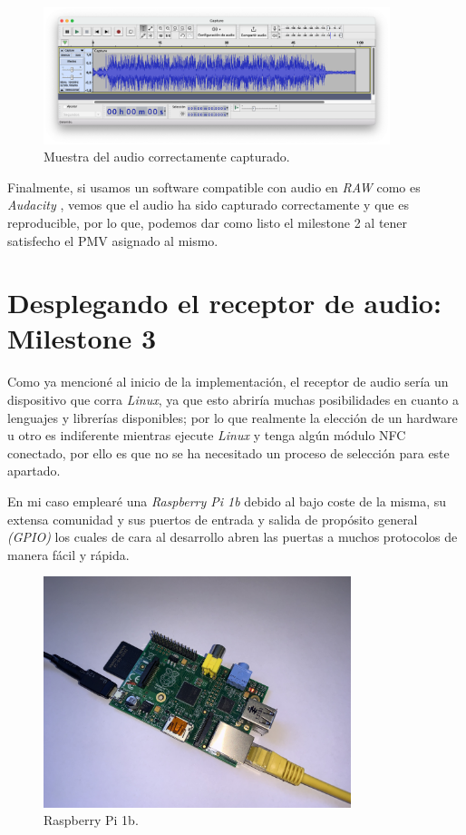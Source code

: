 \begin{figure}[h!]
    \centering
    \includegraphics[width=0.9\textwidth]{fotos/muestra_captura_audacity.png}
    \caption{Muestra del audio correctamente capturado.}
\end{figure}

Finalmente, si usamos un software compatible con audio en \emph{RAW} como es
\emph{Audacity} \cite{software-audacity}, vemos que el audio ha sido capturado
correctamente y que es reproducible, por lo que, podemos dar como listo el
milestone 2 al tener satisfecho el PMV asignado al mismo. 


\section{Desplegando el receptor de audio: Milestone 3}

Como ya mencioné al inicio de la implementación, el receptor de audio sería un
dispositivo que corra \emph{Linux}, ya que esto abriría muchas posibilidades en
cuanto a lenguajes y librerías disponibles; por lo que realmente la elección de un
hardware u otro es indiferente mientras ejecute \emph{Linux} y tenga algún
módulo NFC conectado, por ello es que no se ha necesitado un proceso de
selección para este apartado.

En mi caso emplearé una \emph{Raspberry Pi 1b} debido al bajo coste de la misma, su
extensa comunidad y sus puertos de entrada y salida de propósito general
\emph{(GPIO)} \cite{raspberry-gpio} los cuales de cara al desarrollo abren
las puertas a muchos protocolos de manera fácil y rápida. 

\begin{figure}[h!]
    \centering
    \includegraphics[width=0.8\textwidth]{fotos/raspberry_pi_1b.jpeg}
    \caption{Raspberry Pi 1b.}
\end{figure}

